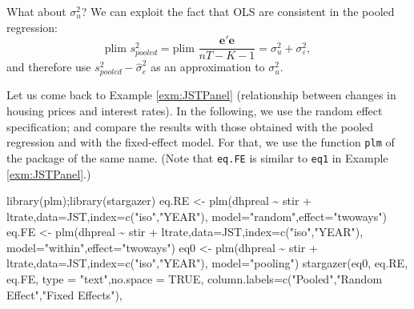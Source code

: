 \documentclass[
  12pt,
]{book}
\newenvironment{Shaded}{\begin{snugshade}}{\end{snugshade}}
\newcommand{\AttributeTok}[1]{\textcolor[rgb]{0.77,0.63,0.00}{#1}}
\newcommand{\ConstantTok}[1]{\textcolor[rgb]{0.00,0.00,0.00}{#1}}
\newcommand{\FunctionTok}[1]{\textcolor[rgb]{0.00,0.00,0.00}{#1}}
\newcommand{\NormalTok}[1]{#1}
\newcommand{\OtherTok}[1]{\textcolor[rgb]{0.56,0.35,0.01}{#1}}
\newcommand{\SpecialCharTok}[1]{\textcolor[rgb]{0.00,0.00,0.00}{#1}}
\newcommand{\StringTok}[1]{\textcolor[rgb]{0.31,0.60,0.02}{#1}}
\theoremstyle{definition}
\theoremstyle{definition}
\theoremstyle{definition}
\theoremstyle{definition}
\theoremstyle{remark}
\begin{document}
What about \(\sigma_u^2\)? We can exploit the fact that OLS are consistent in the pooled regression:
\[
\mbox{plim }s^2_{pooled} = \mbox{plim }\frac{\mathbf{e}'\mathbf{e}}{nT-K-1} = \sigma_u^2 + \sigma_\varepsilon^2,
\]
and therefore use \(s^2_{pooled} - \hat{\sigma}_e^2\) as an approximation to \(\sigma_u^2\).

Let us come back to Example \ref{exm:JSTPanel} (relationship between changes in housing prices and interest rates). In the following, we use the random effect specification; and compare the results with those obtained with the pooled regression and with the fixed-effect model. For that, we use the function \texttt{plm} of the package of the same name. (Note that \texttt{eq.FE} is similar to \texttt{eq1} in Example \ref{exm:JSTPanel}.)

\begin{Shaded}
\begin{Highlighting}[]
\FunctionTok{library}\NormalTok{(plm);}\FunctionTok{library}\NormalTok{(stargazer)}
\NormalTok{eq.RE }\OtherTok{\textless{}{-}} \FunctionTok{plm}\NormalTok{(dhpreal }\SpecialCharTok{\textasciitilde{}}\NormalTok{ stir }\SpecialCharTok{+}\NormalTok{ ltrate,}\AttributeTok{data=}\NormalTok{JST,}\AttributeTok{index=}\FunctionTok{c}\NormalTok{(}\StringTok{"iso"}\NormalTok{,}\StringTok{"YEAR"}\NormalTok{),}
             \AttributeTok{model=}\StringTok{"random"}\NormalTok{,}\AttributeTok{effect=}\StringTok{"twoways"}\NormalTok{)}
\NormalTok{eq.FE }\OtherTok{\textless{}{-}} \FunctionTok{plm}\NormalTok{(dhpreal }\SpecialCharTok{\textasciitilde{}}\NormalTok{ stir }\SpecialCharTok{+}\NormalTok{ ltrate,}\AttributeTok{data=}\NormalTok{JST,}\AttributeTok{index=}\FunctionTok{c}\NormalTok{(}\StringTok{"iso"}\NormalTok{,}\StringTok{"YEAR"}\NormalTok{),}
             \AttributeTok{model=}\StringTok{"within"}\NormalTok{,}\AttributeTok{effect=}\StringTok{"twoways"}\NormalTok{)}
\NormalTok{eq0   }\OtherTok{\textless{}{-}} \FunctionTok{plm}\NormalTok{(dhpreal }\SpecialCharTok{\textasciitilde{}}\NormalTok{ stir }\SpecialCharTok{+}\NormalTok{ ltrate,}\AttributeTok{data=}\NormalTok{JST,}\AttributeTok{index=}\FunctionTok{c}\NormalTok{(}\StringTok{"iso"}\NormalTok{,}\StringTok{"YEAR"}\NormalTok{),}
             \AttributeTok{model=}\StringTok{"pooling"}\NormalTok{) }
\FunctionTok{stargazer}\NormalTok{(eq0, eq.RE, eq.FE, }\AttributeTok{type =} \StringTok{"text"}\NormalTok{,}\AttributeTok{no.space =} \ConstantTok{TRUE}\NormalTok{,}
                     \AttributeTok{column.labels=}\FunctionTok{c}\NormalTok{(}\StringTok{"Pooled"}\NormalTok{,}\StringTok{"Random Effect"}\NormalTok{,}\StringTok{"Fixed Effects"}\NormalTok{),}

\end{Highlighting}
\end{Shaded}
\end{document}
